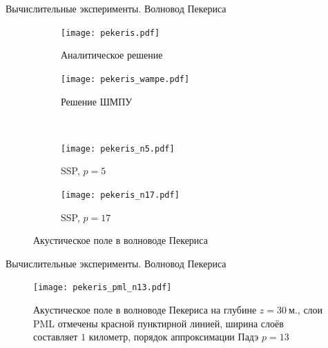 \documentclass[12pt, unicode]{beamer}
\begin{document}
    \begin{frame}[fragile]{Вычислительные эксперименты. Волновод Пекериса}
        \begin{figure}[h]
            \centering
            \begin{subfigure}[t]{0.35\textwidth}
                \centering
                \texttt{[image: pekeris.pdf]}
                \caption{Аналитическое решение}
            \end{subfigure}
            \begin{subfigure}[t]{0.35\textwidth}
                \centering
                \texttt{[image: pekeris\_wampe.pdf]}
                \caption{Решение ШМПУ}
            \end{subfigure}\\
            \begin{subfigure}[t]{0.35\textwidth}
                \centering
                \texttt{[image: pekeris\_n5.pdf]}
                \caption{SSP, $p=5$}
            \end{subfigure}
            \begin{subfigure}[t]{0.35\textwidth}
                \centering
                \texttt{[image: pekeris\_n17.pdf]}
                \caption{SSP, $p=17$}
            \end{subfigure}
            \caption{Акустическое поле в волноводе Пекериса}
        \end{figure}
    \end{frame}

    
    \begin{frame}[fragile]{Вычислительные эксперименты. Волновод Пекериса}
        \begin{figure}[h]
            \centering
            \texttt{[image: pekeris\_pml\_n13.pdf]}
            \caption{Акустическое поле в волноводе Пекериса на глубине $z=30\ \text{м.}$, слои PML отмечены красной пунктирной линией, ширина слоёв составляет $1$ километр, порядок аппроксимации Падэ $p=13$}
        \end{figure}
    \end{frame}
\end{document}
